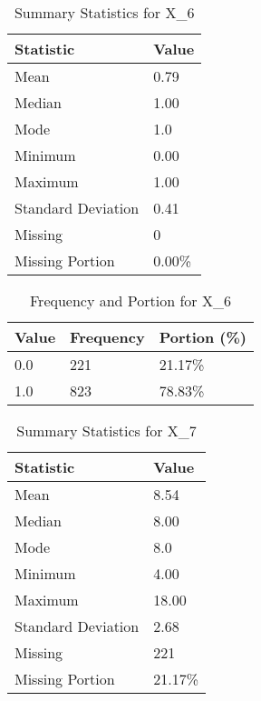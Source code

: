\begin{table}[H]
\centering
\begin{tabular}{|l|l|}
\hline
\textbf{Statistic} & \textbf{Value} \\ \hline
Mean               & 0.79 \\ \hline
Median             & 1.00 \\ \hline
Mode               & 1.0 \\ \hline
Minimum            & 0.00 \\ \hline
Maximum            & 1.00 \\ \hline
Standard Deviation & 0.41 \\ \hline
Missing            & 0 \\ \hline
Missing Portion    & 0.00\% \\ \hline
\end{tabular}
\caption{Summary Statistics for X_6}
\end{table}

\begin{table}[H]
\centering
\begin{tabular}{|l|l|l|}
\hline
\textbf{Value} & \textbf{Frequency} & \textbf{Portion (\%)} \\ \hline
0.0 & 221 & 21.17\% \\ \hline
1.0 & 823 & 78.83\% \\ \hline
\end{tabular}
\caption{Frequency and Portion for X_6}
\end{table}

\begin{table}[H]
\centering
\begin{tabular}{|l|l|}
\hline
\textbf{Statistic} & \textbf{Value} \\ \hline
Mean               & 8.54 \\ \hline
Median             & 8.00 \\ \hline
Mode               & 8.0 \\ \hline
Minimum            & 4.00 \\ \hline
Maximum            & 18.00 \\ \hline
Standard Deviation & 2.68 \\ \hline
Missing            & 221 \\ \hline
Missing Portion    & 21.17\% \\ \hline
\end{tabular}
\caption{Summary Statistics for X_7}
\end{table}


